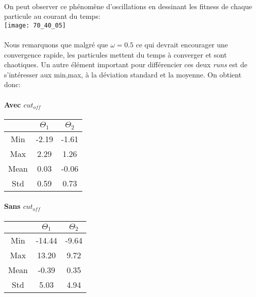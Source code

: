 \documentclass[a4paper, 11pt]{article}
\begin{document}
\paragraph{}On peut observer ce phénomène d'oscillations en dessinant les fitness de chaque particule au courant du temps:\\
\texttt{[image: 70\_40\_05]}

\paragraph{}Nous remarquons que malgré que $\omega =0.5$ ce qui devrait encourager une convergence rapide, les particules mettent du 
temps à converger et sont chaotiques. Un autre élément important pour différencier ces deux \textit{runs} est de s'intéresser aux min,max,
à la déviation standard et la moyenne.
On obtient donc:

\paragraph{Avec $cut_{off}$}
\begin{center}
\begin{tabular}{|c|c|c|}
  \hline
  & $\Theta_1$ & $\Theta_2$\\
  \hline
  Min & -2.19 & -1.61\\
  \hline
  Max & 2.29 & 1.26\\
  \hline
  Mean & 0.03 & -0.06\\
  \hline
  Std & 0.59 & 0.73\\
  \hline
\end{tabular} 
\end{center}


\paragraph{Sans $cut_{off}$}
\begin{center}
\begin{tabular}{|c|c|c|}
  \hline
  & $\Theta_1$ & $\Theta_2$\\
  \hline
  Min & -14.44 & -9.64\\
  \hline
  Max & 13.20 & 9.72\\
  \hline
  Mean & -0.39 & 0.35\\
  \hline
  Std & 5.03 & 4.94\\
  \hline
\end{tabular} 
\end{center}
\end{document}
